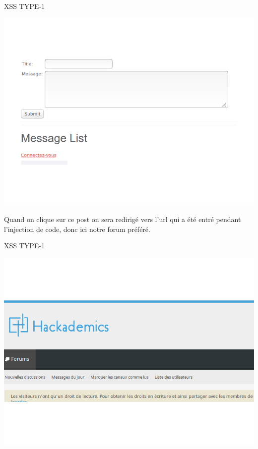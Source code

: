 \begin{center}
\caption{XSS TYPE-1}
\includegraphics[scale=0.3]{Web/assets/xsst101.png}
\end{center}

\bigskip

\begin{flushleft}
Quand on clique sur ce post on sera redirigé vers l’url qui a été entré pendant l’injection de code, donc ici notre forum préféré.
\end{flushleft}

\begin{center}
\caption{XSS TYPE-1}
\includegraphics[scale=0.3]{Web/assets/xssha.png}
\end{center}


